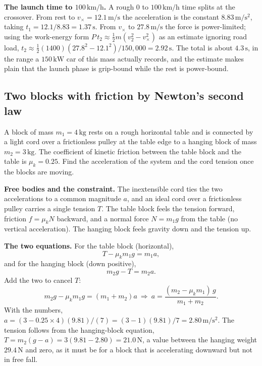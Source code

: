 \textbf{The launch time to $100\,\si{\kilo\meter\per\hour}$.} A rough
$0$ to $100\,\si{\kilo\meter\per\hour}$ time splits at the crossover.
From rest to $v_{\times}=12.1\,\si{\meter\per\second}$ the acceleration
is the constant $8.83\,\si{\meter\per\second\squared}$, taking
$t_{1}=12.1/8.83=1.37\,\si{\second}$. From $v_{\times}$ to $27.8\,\si{
\meter\per\second}$ the force is power-limited; using the work-energy
form $P\,t_{2}\approx\tfrac{1}{2}m(v_{2}^{2}-v_{\times}^{2})$ as an
estimate ignoring road load, $t_{2}\approx\tfrac{1}{2}(1400)(27.8^{2}-
12.1^{2})/150{,}000=2.92\,\si{\second}$. The total is about
$4.3\,\si{\second}$, in the range a $150\,\si{\kilo\watt}$ car of this
mass actually records, and the estimate makes plain that the launch
phase is grip-bound while the rest is power-bound.



\subsection{Two blocks with friction by Newton's second law}

A block of mass $m_{1}=4\,\si{\kilogram}$ rests on a rough horizontal
table and is connected by a light cord over a frictionless pulley at
the table edge to a hanging block of mass $m_{2}=3\,\si{\kilogram}$.
The coefficient of kinetic friction between the table block and the
table is $\mu_{k}=0.25$. Find the acceleration of the system and the
cord tension once the blocks are moving.

\textbf{Free bodies and the constraint.} The inextensible cord ties the
two accelerations to a common magnitude $a$, and an ideal cord over a
frictionless pulley carries a single tension $T$. The table block feels
the tension forward, friction $f=\mu_{k}N$ backward, and a normal force
$N=m_{1}g$ from the table (no vertical acceleration). The hanging block
feels gravity down and the tension up.

\textbf{The two equations.} For the table block (horizontal),
\[
T-\mu_{k}m_{1}g=m_{1}a,
\]
and for the hanging block (down positive),
\[
m_{2}g-T=m_{2}a.
\]
Add the two to cancel $T$:
\[
m_{2}g-\mu_{k}m_{1}g=(m_{1}+m_{2})a
\ \Rightarrow\
a=\frac{(m_{2}-\mu_{k}m_{1})\,g}{m_{1}+m_{2}}.
\]
With the numbers, $a=(3-0.25\times 4)(9.81)/(7)=(3-1)(9.81)/7=
2.80\,\si{\meter\per\second\squared}$. The tension follows from the
hanging-block equation, $T=m_{2}(g-a)=3(9.81-2.80)=21.0\,\si{\newton}$,
a value between the hanging weight $29.4\,\si{\newton}$ and zero, as it
must be for a block that is accelerating downward but not in free fall.

